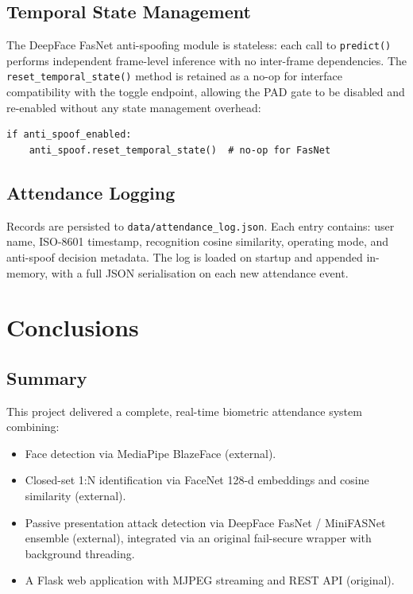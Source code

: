 \documentclass[11pt,a4paper]{article}
\begin{document}
\subsection{Temporal State Management}

The DeepFace FasNet anti-spoofing module is stateless: each call to
\texttt{predict()} performs independent frame-level inference with no inter-frame
dependencies.
The \texttt{reset\_temporal\_state()} method is retained as a no-op for interface
compatibility with the toggle endpoint, allowing the PAD gate to be disabled and
re-enabled without any state management overhead:

\begin{lstlisting}[caption={PAD toggle handler (\texttt{app.py}, \texttt{/toggle\_antispoof}).}]
if anti_spoof_enabled:
    anti_spoof.reset_temporal_state()  # no-op for FasNet
\end{lstlisting}

\subsection{Attendance Logging}

Records are persisted to \texttt{data/attendance\_log.json}.
Each entry contains: user name, ISO-8601 timestamp, recognition cosine similarity,
operating mode, and anti-spoof decision metadata.
The log is loaded on startup and appended in-memory, with a full JSON serialisation
on each new attendance event.

\section{Conclusions}
\label{sec:conclusions}

\subsection{Summary}

This project delivered a complete, real-time biometric attendance system combining:

\begin{itemize}
  \item Face detection via MediaPipe BlazeFace (external).
  \item Closed-set 1:N identification via FaceNet 128-d embeddings and cosine
        similarity (external).
  \item Passive presentation attack detection via DeepFace FasNet / MiniFASNet
        ensemble (external), integrated via an original fail-secure wrapper with
        background threading.
  \item A Flask web application with MJPEG streaming and REST API (original).
\end{itemize}
\end{document}
